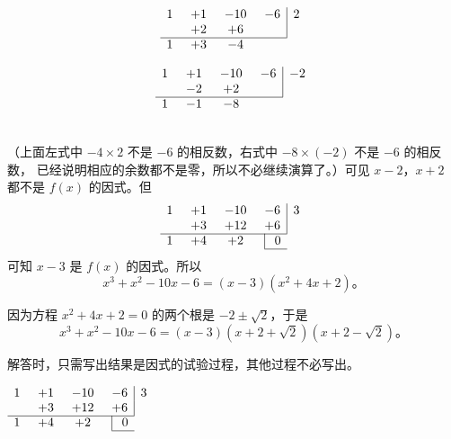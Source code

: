 \begin{minipage}{6cm}
    $$
    \begin{array}{*{3}{c@{\hspace{0.5cm}}}c|l}
        1 & +1 & -10 & -6 & 2 \\
          & +2 &  +6 &    &   \\
        \cline{1-4}
        1 & +3 &  -4 & \multicolumn{1}{r}{ } &
    \end{array}
    $$
\end{minipage}
\begin{minipage}{6cm}
    $$
    \begin{array}{*{3}{c@{\hspace{0.5cm}}}c|l}
        1 & +1 & -10 & -6 & -2 \\
          & -2 &  +2 &    &    \\
        \cline{1-4}
        1 & -1 &  -8 & \multicolumn{1}{r}{ } &
    \end{array}
    $$
\end{minipage}\\
（上面左式中 $-4 \times 2$ 不是 $-6$ 的相反数，右式中 $-8 \times (-2)$ 不是 $-6$ 的相反数，
已经说明相应的余数都不是零，所以不必继续演算了。）可见 $x - 2$，$x + 2$ 都不是 $f(x)$ 的因式。但
$$
\begin{array}{*{3}{c@{\hspace{0.5cm}}}c|l}
    1 & +1 & -10 & -6 & 3 \\
      & +3 & +12 & +6 &   \\
    \cline{1-4}
    1 & +4 &  +2 & \multicolumn{1}{|r}{ 0 } & \\
    \cline{4-4}
\end{array}
$$
可知 $x - 3$ 是 $f(x)$ 的因式。所以
$$ x^3 + x^2 - 10x - 6 = (x - 3) (x^2 + 4x + 2) \text{。} $$

因为方程 $x^2 + 4x + 2 = 0$ 的两个根是 $-2 \pm \sqrt{2}$，于是
$$ x^3 + x^2 - 10x - 6 = (x - 3) (x + 2 + \sqrt{2}) (x + 2 - \sqrt{2}) \text{。} $$

解答时，只需写出结果是因式的试验过程，其他过程不必写出。

\jie \qquad $\begin{array}[t]{*{3}{c@{\hspace{0.5cm}}}c|l}
    1 & +1 & -10 & -6 & 3 \\
      & +3 & +12 & +6 &   \\
    \cline{1-4}
    1 & +4 &  +2 & \multicolumn{1}{|r}{ 0 } & \\
    \cline{4-4}
\end{array}$

